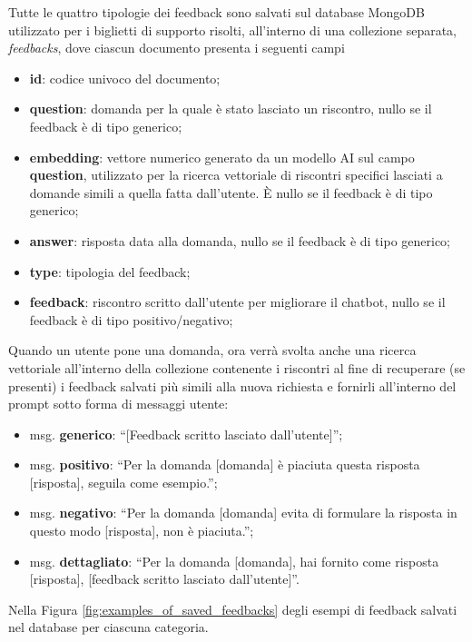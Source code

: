  Tutte le quattro tipologie dei feedback sono salvati sul database MongoDB utilizzato per i biglietti di supporto risolti, all'interno di una collezione separata, \textit{feedbacks}, dove ciascun documento presenta i seguenti campi
 \begin{itemize}
     \item \textbf{id}: codice univoco del documento; 
     \item \textbf{question}: domanda per la quale è stato lasciato un riscontro, nullo se il feedback è di tipo generico;
     \item \textbf{embedding}: vettore numerico generato da un modello AI sul campo \textbf{question},
     utilizzato per la ricerca vettoriale di riscontri specifici lasciati a domande simili a quella fatta dall’utente. È nullo se il feedback è di tipo generico;
     \item \textbf{answer}: risposta data alla domanda, nullo se il feedback è di tipo generico;
     \item \textbf{type}: tipologia del feedback;
     \item \textbf{feedback}: riscontro scritto dall’utente per migliorare il chatbot, nullo se il feedback è di tipo positivo/negativo;
 \end{itemize}
 
 Quando un utente pone una domanda, ora verrà svolta anche una ricerca vettoriale all’interno della collezione contenente i riscontri al fine di recuperare (se presenti) i feedback salvati più simili alla nuova richiesta e fornirli all’interno del prompt sotto forma di messaggi utente:
 \begin{itemize}
     \item msg. \textbf{generico}: “[Feedback scritto lasciato dall'utente]”;
     \item msg. \textbf{positivo}: “Per la domanda [domanda] è piaciuta questa risposta [risposta], seguila come esempio.”;
     \item msg. \textbf{negativo}: “Per la domanda [domanda] evita di formulare la risposta in questo modo [risposta], non è piaciuta.”;
     \item msg. \textbf{dettagliato}: “Per la domanda [domanda], hai fornito come risposta [risposta], [feedback scritto lasciato dall’utente]”.
 \end{itemize}

 Nella Figura \ref{fig:examples_of_saved_feedbacks} degli esempi di feedback salvati nel database per ciascuna categoria.

